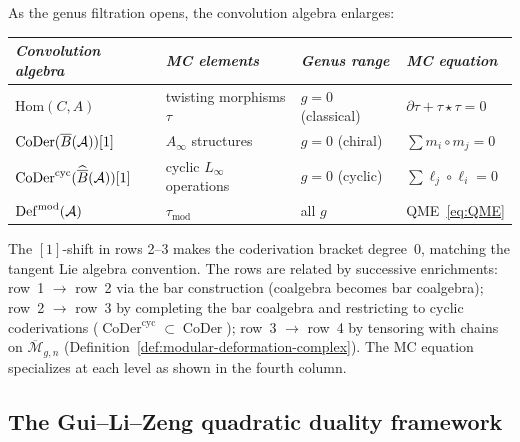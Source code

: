 \begin{remark}
\label{rem:convolution-hierarchy}
As the genus filtration opens, the convolution algebra enlarges:

\smallskip
\begin{center}
\renewcommand{\arraystretch}{1.4}
\begin{tabular}{llll}
\toprule
\emph{Convolution algebra} & \emph{MC elements}
  & \emph{Genus range} & \emph{MC equation} \\
\midrule
$\mathrm{Hom}(C, A)$
  & twisting morphisms $\tau$
  & $g = 0$ (classical)
  & $\partial\tau + \tau\star\tau = 0$ \\
$\mathrm{CoDer}(\overline{B}(\mathcal{A}))[1]$
  & $A_\infty$ structures
  & $g = 0$ (chiral)
  & $\sum m_i \circ m_j = 0$ \\
$\operatorname{CoDer}^{\mathrm{cyc}}(\widehat{\overline{B}}(\mathcal{A}))[1]$
  & cyclic $L_\infty$ operations
  & $g = 0$ (cyclic)
  & $\sum \ell_j \circ \ell_i = 0$ \\
$\operatorname{Def}^{\mathrm{mod}}(\mathcal{A})$
  & $\tau_{\mathrm{mod}}$
  & all $g$
  & QME~\eqref{eq:QME} \\
\bottomrule
\end{tabular}
\end{center}
\smallskip

\noindent
The $[1]$-shift in rows 2--3 makes the coderivation bracket
degree~$0$, matching the tangent Lie algebra convention.
The rows are related by successive enrichments:
row~1 $\to$ row~2 via the bar construction (coalgebra
becomes bar coalgebra);
row~2 $\to$ row~3 by completing the bar coalgebra and
restricting to cyclic coderivations
($\operatorname{CoDer}^{\mathrm{cyc}} \subset
\operatorname{CoDer}$);
row~3 $\to$ row~4 by tensoring with chains on
$\overline{\mathcal{M}}_{g,n}$
(Definition~\ref{def:modular-deformation-complex}).
The MC equation specializes at each level as shown in the
fourth column.
\end{remark}

\subsection{The Gui--Li--Zeng quadratic duality framework}
\label{subsec:gui-li-zeng-framework}

